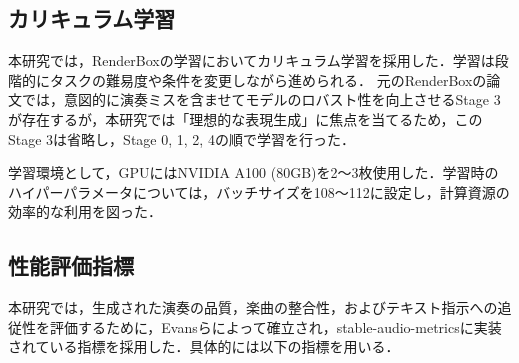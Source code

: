 \subsection{カリキュラム学習}
\label{subsec:カリキュラム学習}

本研究では，RenderBoxの学習においてカリキュラム学習を採用した．学習は段階的にタスクの難易度や条件を変更しながら進められる．
元のRenderBoxの論文では，意図的に演奏ミスを含ませてモデルのロバスト性を向上させるStage 3が存在するが，本研究では「理想的な表現生成」に焦点を当てるため，このStage 3は省略し，Stage 0, 1, 2, 4の順で学習を行った．

学習環境として，GPUにはNVIDIA A100 (80GB)を2〜3枚使用した．学習時のハイパーパラメータについては，バッチサイズを108〜112に設定し，計算資源の効率的な利用を図った．

\subsection{性能評価指標}
\label{subsec:性能評価指標}

本研究では，生成された演奏の品質，楽曲の整合性，およびテキスト指示への追従性を評価するために，Evansら\cite{stable-audio-open}によって確立され，stable-audio-metricsに実装されている指標を採用した．具体的には以下の指標を用いる．

